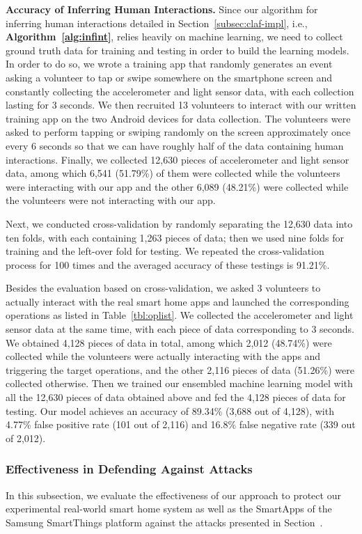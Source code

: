 \documentclass[letterpaper,12pt]{article}
\begin{document}
\textbf{Accuracy of Inferring Human Interactions.} 
Since our algorithm for inferring human interactions detailed in Section~\ref{subsec:claf-impl}, i.e., {\bf Algorithm~\ref{alg:infint}}, relies heavily on machine learning, we need to collect ground truth data for training and testing in order to build the learning models. In order to do so, we wrote a training app that randomly generates an event asking a volunteer to tap or swipe somewhere on the smartphone screen and constantly collecting the accelerometer and light sensor data, with each collection lasting for 3 seconds. We then recruited 13 volunteers to interact with our written training app on the two Android devices for data collection. The volunteers were asked to perform tapping or swiping randomly on the screen approximately once every 6 seconds so that we can have roughly half of the data containing human interactions. Finally, we collected 12,630 pieces of accelerometer and light sensor data, among which 6,541 (51.79\%) of them were collected while the volunteers were interacting with our app and the other 6,089 (48.21\%) were collected while the volunteers were not interacting with our app. 

Next, we conducted cross-validation by randomly separating the 12,630 data into ten folds, with each containing 1,263 pieces of data; then we used nine folds for training and the left-over fold for testing. We repeated the cross-validation process for 100 times and the averaged accuracy of these testings is 91.21\%.

Besides the evaluation based on cross-validation, we asked 3 volunteers to actually interact with the real smart home apps and launched the corresponding operations as listed in Table~\ref{tbl:oplist}. We collected the accelerometer and light sensor data at the same time, with each piece of data corresponding to 3 seconds. We obtained 4,128 pieces of data in total, among which 2,012 (48.74\%) were collected while the volunteers were actually interacting with the apps and triggering the target operations, and the other 2,116 pieces of data (51.26\%) were collected otherwise. Then we trained our ensembled machine learning model with all the 12,630 pieces of data obtained above and fed the 4,128 pieces of data for testing. Our model achieves an accuracy of 89.34\% (3,688 out of 4,128), with 4.77\% false positive rate (101 out of 2,116) and 16.8\% false negative rate (339 out of 2,012).

\subsubsection{Effectiveness in Defending Against Attacks}
In this subsection, we evaluate the effectiveness of our approach to protect our experimental real-world smart home system as well as the SmartApps of the Samsung SmartThings platform against the attacks presented in Section~.
\end{document}
